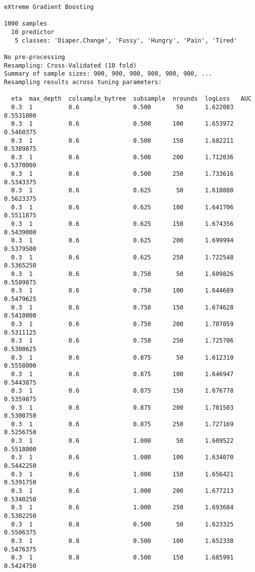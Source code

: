 \documentclass[
  letterpaper,
  DIV=11,
  numbers=noendperiod]{scrartcl}
\begin{document}
\begin{verbatim}
eXtreme Gradient Boosting 

1000 samples
  10 predictor
   5 classes: 'Diaper.Change', 'Fussy', 'Hungry', 'Pain', 'Tired' 

No pre-processing
Resampling: Cross-Validated (10 fold) 
Summary of sample sizes: 900, 900, 900, 900, 900, 900, ... 
Resampling results across tuning parameters:

  eta  max_depth  colsample_bytree  subsample  nrounds  logLoss   AUC      
  0.3  1          0.6               0.500       50      1.622083  0.5531000
  0.3  1          0.6               0.500      100      1.653972  0.5460375
  0.3  1          0.6               0.500      150      1.682211  0.5389875
  0.3  1          0.6               0.500      200      1.712036  0.5370000
  0.3  1          0.6               0.500      250      1.733616  0.5343375
  0.3  1          0.6               0.625       50      1.610880  0.5623375
  0.3  1          0.6               0.625      100      1.641706  0.5511875
  0.3  1          0.6               0.625      150      1.674356  0.5439000
  0.3  1          0.6               0.625      200      1.699994  0.5379500
  0.3  1          0.6               0.625      250      1.722548  0.5365250
  0.3  1          0.6               0.750       50      1.609826  0.5589875
  0.3  1          0.6               0.750      100      1.644689  0.5479625
  0.3  1          0.6               0.750      150      1.674628  0.5410000
  0.3  1          0.6               0.750      200      1.707059  0.5311125
  0.3  1          0.6               0.750      250      1.725706  0.5300625
  0.3  1          0.6               0.875       50      1.612310  0.5558000
  0.3  1          0.6               0.875      100      1.646947  0.5443875
  0.3  1          0.6               0.875      150      1.676778  0.5359875
  0.3  1          0.6               0.875      200      1.701503  0.5300750
  0.3  1          0.6               0.875      250      1.727169  0.5256750
  0.3  1          0.6               1.000       50      1.609522  0.5518000
  0.3  1          0.6               1.000      100      1.634070  0.5442250
  0.3  1          0.6               1.000      150      1.656421  0.5391750
  0.3  1          0.6               1.000      200      1.677213  0.5340250
  0.3  1          0.6               1.000      250      1.693684  0.5302250
  0.3  1          0.8               0.500       50      1.623325  0.5506375
  0.3  1          0.8               0.500      100      1.652338  0.5476375
  0.3  1          0.8               0.500      150      1.685991  0.5424750

\end{verbatim}
\end{document}
